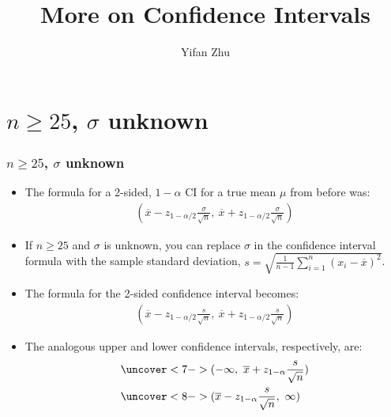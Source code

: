 \documentclass[handout]{beamer}\usepackage[]{graphicx}\usepackage[]{color}
\title{More on Confidence Intervals}
\author{Yifan Zhu}
\date{}
\institute{Iowa State University}
\providecommand{\ov}[1]{\overline{#1}}
\numberwithin{equation}{section}
\begin{document}
\begin{frame}
\titlepage
 \end{frame}
 

\section{$n \ge 25$, $\sigma$ unknown}


\begin{frame}
\frametitle{$n \ge 25$, $\sigma$ unknown} \small
\begin{itemize}
\item The formula for a 2-sided, $1 - \alpha$ CI for a true mean $\mu$ from before was:
\pause \begin{align*}
(\ov{x} - z_{1 - \alpha/2} \frac{\sigma}{\sqrt{n}}, \ \ov{x} + z_{1 - \alpha/2} \frac{\sigma}{\sqrt{n}})
\end{align*}
\pause \item If $n \ge 25$ and $\sigma$ is unknown, you can replace $\sigma$ in the confidence interval formula with the sample standard deviation, $s = \sqrt{\frac{1}{n-1} \sum_{i = 1}^n (x_i - \ov{x})^2}$.
\pause \item The formula for the 2-sided confidence interval becomes:
\pause \begin{align*}
(\ov{x} - z_{1 - \alpha/2} \frac{s}{\sqrt{n}}, \ \ov{x} + z_{1 - \alpha/2} \frac{s}{\sqrt{n}})
\end{align*}
\pause \item The analogous upper and lower confidence intervals, respectively, are:
\begin{align*}
&\uncover<7->{(-\infty, \ \ov{x} + z_{1 - \alpha} \frac{s}{\sqrt{n}})} \\
&\uncover<8->{(\ov{x} - z_{1 - \alpha} \frac{s}{\sqrt{n}}, \ \infty)}
\end{align*}
\end{itemize}
\end{frame}
\end{document}
